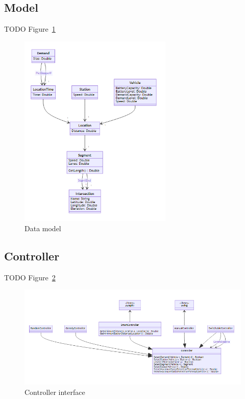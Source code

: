 \documentclass{article}
\begin{document}
    \subsection{Model}
    TODO Figure~\ref{fig:1}

    \begin{figure}
        \centering
        \includegraphics[width=0.65\textwidth,angle=90]{../../diagrams/model/classes-v0.png}
        \caption{Data model}
        \label{fig:1}
    \end{figure}

    \subsection{Controller}
    TODO Figure~\ref{fig:2}

    \begin{figure}
        \centering
        \includegraphics[width=\textwidth]{../../diagrams/controller/classes.png}
        \caption{Controller interface}
        \label{fig:2}
    \end{figure}
\end{document}
